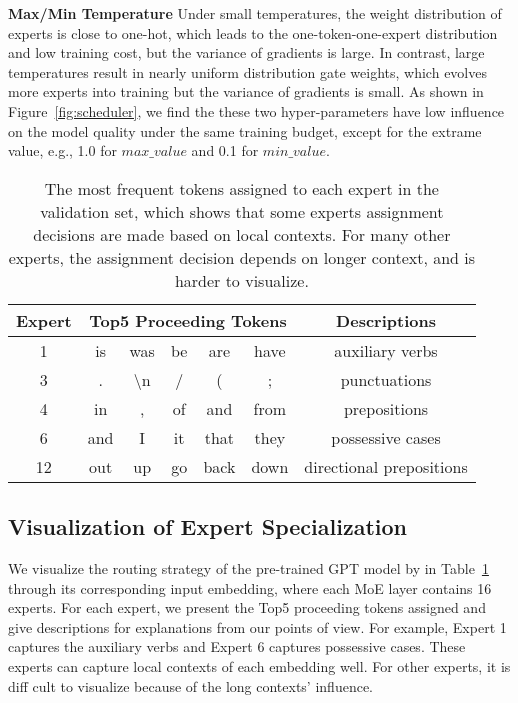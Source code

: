 \textbf{Max/Min Temperature} Under small temperatures, the weight distribution of experts is close to one-hot, which leads to the one-token-one-expert distribution and low training cost, 
but the variance of gradients is large.
In contrast, large temperatures result in nearly uniform distribution gate weights, 
which evolves more experts into training but the variance of gradients is small. As shown in Figure~\ref{fig:scheduler}, we find the these two hyper-parameters have low influence on the model quality under the same training budget, except for the extrame value, e.g., 1.0 for $max\_value$ and 0.1 for $min\_value$.

\begin{table}[t]
    \caption{The most frequent tokens assigned to each expert in the validation set, which shows that some experts assignment decisions are made based on local contexts. For many other experts, the assignment decision depends on longer context, and is harder to visualize.}
        \begin{center}
            \begin{tabular}{c|ccccc|c}
            \toprule 
            \textbf{Expert}  & \multicolumn{5}{c|}{\textbf{Top5 Proceeding Tokens}} & \textbf{Descriptions} \\  
            \midrule
            1 & is & was & be & are & have & auxiliary verbs \\
            3 & .& \textbackslash n & /& (&;  & punctuations \\
            4 & in& , & of& and& from & prepositions \\
            6 & and& I & it& that& they & possessive cases\\
            12 & out& up & go& back& down & directional prepositions \\
            \bottomrule
            \end{tabular}
        \end{center}
\label{tab:visual}
\end{table}

\subsection{Visualization of Expert Specialization}

We visualize the routing strategy of the pre-trained GPT model by \ourmethods{} in Table~\ref{tab:visual} through its corresponding input embedding, where each MoE layer contains 16 experts. For each expert, we present the Top5 proceeding tokens assigned and give descriptions for explanations from our points of view. For example, Expert 1 captures the auxiliary verbs and Expert 6 captures possessive cases. These experts can capture local contexts of each embedding well. For other experts, it is diff cult to visualize because of the long contexts' influence.
